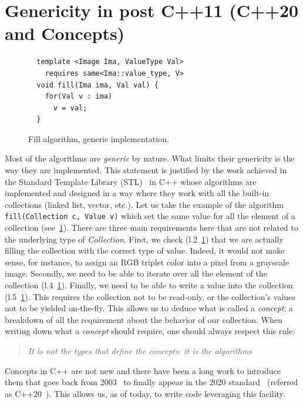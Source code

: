 \section{Genericity in post C++11 (C++20 and Concepts)}
\label{sec:postcpp11}

\begin{figure}[tbh]
  \centering
  \begin{verbatim}
  template <Image Ima, ValueType Val>
    requires same<Ima::value_type, V>
  void fill(Ima ima, Val val) {
    for(Val v : ima)
      v = val;
  }
  \end{verbatim}

  \caption{Fill algorithm, generic implementation.}
  \label{code:gen.fill}
\end{figure}

Most of the algorithms are \emph{generic} by nature. What limits their genericity is the way they are implemented. This
statement is justified by the work achieved in the Standard Template Library (STL)~\parencite{dehnert.1998.fundamentals}
in C++ whose algorithms are implemented and designed in a way where they work with all the built-in collections (linked
list, vector, etc.). Let us take the example of the algorithm \texttt{fill(Collection c, Value v)} which set the same
value for all the element of a collection (see~\cref{code:gen.fill}). There are three main requirements here that are not
related to the underlying type of \emph{Collection}. First, we check (l.2~\ref{code:gen.fill}) that we are actually
filling the collection with the correct type of value. Indeed, it would not make sense, for instance, to assign an RGB
triplet color into a pixel from a grayscale image. Secondly, we need to be able to iterate over all the element of the
collection (l.4~\ref{code:gen.fill}). Finally, we need to be able to write a value into the collection
(l.5~\ref{code:gen.fill}). This requires the collection not to be read-only, or the collection's values not to be yielded
on-the-fly. This allows us to deduce what is called a \emph{concept}: a breakdown of all the requirement about the
behavior of our collection. When writing down what a \emph{concept} should require, one should always respect this rule:
\blockquote{\emph{It is not the types that define the concepts: it is the algorithms}}. Concepts in C++ are not new and
there have been a long work to introduce them that goes back from
2003~\parencite{seymour.2009.concepts,stroustrup.2003.concepts,sutton.2017.concepts} to finally appear in the 2020
standard~\cite{voutilainen.2017.concepts} (referred as C++20~\parencite{iso.2011.cpp}). This allows us, as of today, to
write code leveraging this facility.

